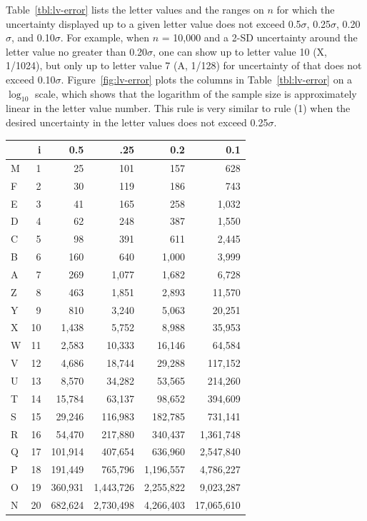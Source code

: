 \documentclass[12pt,oneside]{article}
\begin{document}
Table~\ref{tbl:lv-error} lists the letter values and the ranges on $n$ for which the uncertainty displayed up to a given letter value does not exceed 0.5$\sigma$, 0.25$\sigma$, 0.20$\sigma$, and 0.10$\sigma$. For example, when $n$ = 10,000 and a 2-SD uncertainty around the letter value no greater than 0.20$\sigma$, one can show up to letter value 10 (X, 1/1024), but only up to letter value 7 (A, 1/128) for uncertainty of that does not exceed 0.10$\sigma$. Figure~\ref{fig:lv-error} plots the columns in Table~\ref{tbl:lv-error} on a $\log_{10}$ scale, which shows that the logarithm of the sample size is approximately linear in the letter value number. This rule is very similar to rule (1) when the desired uncertainty in the letter values does not exceed 0.25$\sigma$.

\begin{table}
  \begin{center}
  \begin{tabular}{lrrrrr}
    \toprule
      &  i &    0.5 &     .25 &     0.2 &      0.1 \\
    \midrule
    M &  1 &     25 &     101 &     157 &      628 \\
    F &  2 &     30 &     119 &     186 &      743 \\
    E &  3 &     41 &     165 &     258 &     1,032 \\
    D &  4 &     62 &     248 &     387 &     1,550 \\
    C &  5 &     98 &     391 &     611 &     2,445 \\[3pt]
    B &  6 &    160 &     640 &    1,000 &     3,999 \\
    A &  7 &    269 &    1,077 &    1,682 &     6,728 \\
    Z &  8 &    463 &    1,851 &    2,893 &    11,570 \\
    Y &  9 &    810 &    3,240 &    5,063 &    20,251 \\
    X & 10 &   1,438 &    5,752 &    8,988 &    35,953  \\[3pt]
    W & 11 &   2,583 &   10,333 &   16,146 &    64,584 \\
    V & 12 &   4,686 &   18,744 &   29,288 &   117,152 \\
    U & 13 &   8,570 &   34,282 &   53,565 &   214,260 \\
    T & 14 &  15,784 &   63,137 &   98,652 &   394,609 \\
    S & 15 &  29,246 &  116,983 &  182,785 &   731,141  \\[3pt]
    R & 16 &  54,470 &  217,880 &  340,437 &  1,361,748 \\
    Q & 17 & 101,914 &  407,654 &  636,960 &  2,547,840 \\
    P & 18 & 191,449 &  765,796 & 1,196,557 &  4,786,227 \\
    O & 19 & 360,931 & 1,443,726 & 2,255,822 &  9,023,287 \\
    N & 20 & 682,624 & 2,730,498 & 4,266,403 & 17,065,610 \\
    \bottomrule
    

\end{tabular}
\end{center}
\end{table}
\end{document}
